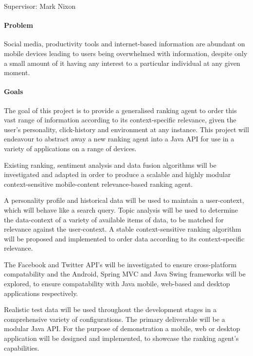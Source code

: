 \documentclass[12pt]{article}
\begin{document}
\maketitle
Supervisor: Mark Nixon

\paragraph{Problem}
Social media, productivity tools and internet-based information are abundant on mobile devices leading to users being overwhelmed with information, despite only a small amount of it having any interest to a particular individual at any given moment.

\paragraph{Goals}
The goal of this project is to provide a generalised ranking agent to order this vast range of information according to its context-specific relevance, given the user's personality, click-history and environment at any instance. This project will endeavour to abstract away a new ranking agent into a Java API for use in a variety of applications on a range of devices.

Existing ranking, sentiment analysis and data fusion algorithms will be investigated and adapted in order to produce a scalable and highly modular context-sensitive mobile-content relevance-based ranking agent.

 A personality profile and historical data will be used to maintain a user-context, which will behave like a search query. Topic analysis will be used to determine the data-context of a variety of available items of data, to be matched for relevance against the user-context. A stable context-sensitive ranking algorithm will be proposed and implemented to order data according to its context-specific relevance.

The Facebook and Twitter API's will be investigated to ensure cross-platform compatability and the Android, Spring MVC and Java Swing frameworks will be explored, to ensure compatability with Java mobile, web-based and desktop applications respectively. 

Realistic test data will be used throughout the development stages in a comprehensive variety of configurations. 
The primary deliverable will be a modular Java API. For the purpose of demonstration a mobile, web or desktop application will be designed and implemented, to showcase the ranking agent's capabilities. 
\end{document}
